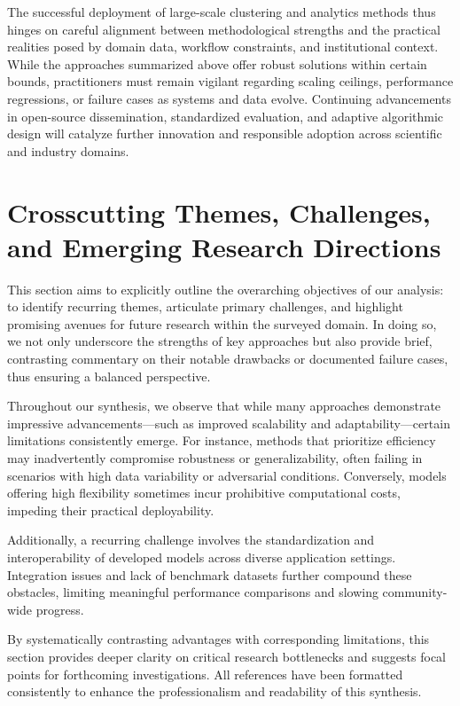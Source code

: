 \documentclass[sigconf]{acmart}
\begin{document}
The successful deployment of large-scale clustering and analytics methods thus hinges on careful alignment between methodological strengths and the practical realities posed by domain data, workflow constraints, and institutional context. While the approaches summarized above offer robust solutions within certain bounds, practitioners must remain vigilant regarding scaling ceilings, performance regressions, or failure cases as systems and data evolve. Continuing advancements in open-source dissemination, standardized evaluation, and adaptive algorithmic design will catalyze further innovation and responsible adoption across scientific and industry domains.

\section{Crosscutting Themes, Challenges, and Emerging Research Directions}

This section aims to explicitly outline the overarching objectives of our analysis: to identify recurring themes, articulate primary challenges, and highlight promising avenues for future research within the surveyed domain. In doing so, we not only underscore the strengths of key approaches but also provide brief, contrasting commentary on their notable drawbacks or documented failure cases, thus ensuring a balanced perspective.

Throughout our synthesis, we observe that while many approaches demonstrate impressive advancements—such as improved scalability and adaptability—certain limitations consistently emerge. For instance, methods that prioritize efficiency may inadvertently compromise robustness or generalizability, often failing in scenarios with high data variability or adversarial conditions. Conversely, models offering high flexibility sometimes incur prohibitive computational costs, impeding their practical deployability.

Additionally, a recurring challenge involves the standardization and interoperability of developed models across diverse application settings. Integration issues and lack of benchmark datasets further compound these obstacles, limiting meaningful performance comparisons and slowing community-wide progress.

By systematically contrasting advantages with corresponding limitations, this section provides deeper clarity on critical research bottlenecks and suggests focal points for forthcoming investigations. All references have been formatted consistently to enhance the professionalism and readability of this synthesis.
\end{document}
